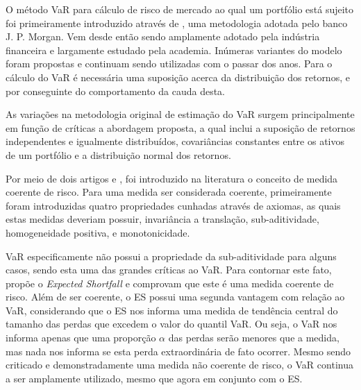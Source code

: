 \documentclass[1p]{elsarticle}
\theoremstyle{definition}
\begin{document}
O método VaR para cálculo de risco de mercado ao qual um portfólio está sujeito foi primeiramente introduzido através de \cite{RiskMetrics1995}, uma metodologia adotada pelo banco J. P. Morgan. Vem desde então sendo amplamente adotado pela indústria financeira e largamente estudado pela academia. Inúmeras variantes do modelo foram propostas e continuam sendo utilizadas com o passar dos anos. Para o cálculo do VaR é necessária uma suposição acerca da distribuição dos retornos, e por conseguinte do comportamento da cauda desta.

As variações na metodologia original de estimação do VaR surgem principalmente em função de críticas a abordagem proposta, a qual inclui a suposição de retornos independentes e igualmente distribuídos, covariâncias constantes entre os ativos de um portfólio e a distribuição normal dos retornos.

Por meio de dois artigos \cite{Artzner1997} e \cite{Artzner1999}, foi introduzido na literatura o conceito de medida coerente de risco. Para uma medida ser considerada coerente, primeiramente foram introduzidas quatro propriedades cunhadas através de axiomas, as quais estas medidas deveriam possuir, invariância a translação,	sub-aditividade, homogeneidade positiva, e monotonicidade.

VaR especificamente não possui a propriedade da sub-aditividade para alguns casos, sendo esta uma das grandes críticas ao VaR. Para contornar este fato, \cite{Acerbi2002} propõe o \emph{Expected Shortfall} e comprovam que este é uma medida coerente de risco. Além de ser coerente, o ES possui uma segunda vantagem com relação ao VaR, considerando que o ES nos informa uma medida de tendência central do tamanho das perdas que excedem o valor do quantil VaR. Ou seja, o VaR nos informa apenas que uma proporção $\alpha$ das perdas serão menores que a medida, mas nada nos informa se esta perda extraordinária de fato ocorrer. Mesmo sendo criticado e demonstradamente uma medida não coerente de risco, o VaR continua a ser amplamente utilizado, mesmo que agora em conjunto com o ES. 

\end{document}
